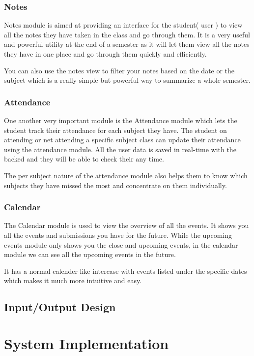 \documentclass{article}
\begin{document}
\subsubsection{Notes}
Notes module is aimed at providing an interface for the student( user ) to view all the notes they have taken in the class and go through them.
It is a very useful and powerful utility at the end of a semester as it will let them view all the notes they have in one place and go through them quickly and efficiently.

You can also use the notes view to filter your notes based on the date or the subject which is a really simple but powerful way to summarize a whole semester.

\subsubsection{Attendance}
One another very important module is the Attendance module which lets the student track their attendance for each subject they have. The student on attending or net attending a specific subject class can update their attendance using the attendance module. All the user data is saved in real-time with the backed and they will be able to check their any time.

The per subject nature of the attendance module also helps them to know which subjects they have missed the most and concentrate on them individually.

\subsubsection{Calendar}
The Calendar module is used to view the overview of all the events. It shows you all the events and submissions you have for the future. While the upcoming events module only shows you the close and upcoming events, in the calendar module we can see all the upcoming events in the future.

It has a normal calender like intercase with events listed under the specific dates which makes it much more intuitive and easy.

\vspace{1em}
\subsection{Input/Output Design}
\vspace{1em}


\newpage

\section{System Implementation}
\vspace{1em}
\end{document}

